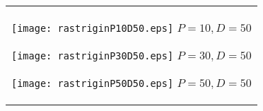 \documentclass[a4paper,11pt,oneside,openany]{jsbook}
\begin{document}
\begin{figure}[htbp]
  \begin{center}
    \begin{tabular}{c}


      \begin{minipage}{0.33\hsize}
        \begin{center}
          \texttt{[image: rastriginP10D50.eps]}
          \hspace{1.2cm} $P=10, D=50
$        \end{center}
      \end{minipage}

      \begin{minipage}{0.33\hsize}
        \begin{center}
          \texttt{[image: rastriginP30D50.eps]}
          \hspace{1.2cm} $P=30, D=50
$        \end{center}
      \end{minipage}

      \begin{minipage}{0.33\hsize}
        \begin{center}
          \texttt{[image: rastriginP50D50.eps]}
          \hspace{1.2cm} $P=50, D=50
$        \end{center}
      \end{minipage}
    \end{tabular}
  \end{center}
\end{figure}
\end{document}
